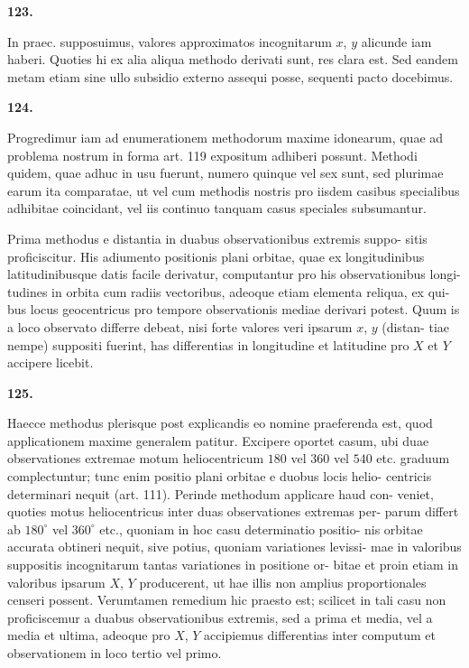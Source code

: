 \documentclass[12pt,a4paper]{article}
\begin{document}
\bigskip
\noindent\textbf{123.}

In praec. supposuimus, valores approximatos incognitarum $x$, $y$ alicunde
iam haberi. Quoties hi ex alia aliqua methodo derivati sunt, res clara est.
Sed eandem metam etiam sine ullo subsidio externo assequi posse, sequenti
pacto docebimus.

\bigskip
\noindent\textbf{124.}

Progredimur iam ad enumerationem methodorum maxime idonearum, quae
ad problema nostrum in forma art. 119 expositum adhiberi possunt. Methodi
quidem, quae adhuc in usu fuerunt, numero quinque vel sex sunt, sed plurimae
earum ita comparatae, ut vel cum methodis nostris pro iisdem casibus specialibus
adhibitae coincidant, vel iis continuo tanquam casus speciales subsumantur.

Prima methodus e distantia in duabus observationibus extremis suppo-
sitis proficiscitur. His adiumento positionis plani orbitae, quae ex longitudinibus
latitudinibusque datis facile derivatur, computantur pro his observationibus longi-
tudines in orbita cum radiis vectoribus, adeoque etiam elementa reliqua, ex qui-
bus locus geocentricus pro tempore observationis mediae derivari potest. Quum
is a loco observato differre debeat, nisi forte valores veri ipsarum $x$, $y$ (distan-
tiae nempe) suppositi fuerint, has differentias in longitudine et latitudine pro $X$
et $Y$ accipere licebit.

\bigskip
\noindent\textbf{125.}

Haecce methodus plerisque post explicandis eo nomine praeferenda est,
quod applicationem maxime generalem patitur. Excipere oportet casum, ubi
duae observationes extremae motum heliocentricum $180$ vel $360$ vel $540$ etc.
graduum complectuntur; tunc enim positio plani orbitae e duobus locis helio-
centricis determinari nequit (art. 111). Perinde methodum applicare haud con-
veniet, quoties motus heliocentricus inter duas observationes extremas per-
parum differt ab $180^\circ$ vel $360^\circ$ etc., quoniam in hoc casu determinatio positio-
nis orbitae accurata obtineri nequit, sive potius, quoniam variationes levissi-
mae in valoribus suppositis incognitarum tantas variationes in positione or-
bitae et proin etiam in valoribus ipsarum $X$, $Y$ producerent, ut hae illis non
amplius proportionales censeri possent. Verumtamen remedium hic praesto
est; scilicet in tali casu non proficiscemur a duabus observationibus extremis,
sed a prima et media, vel a media et ultima, adeoque pro $X$, $Y$ accipiemus
differentias inter computum et observationem in loco tertio vel primo.
\end{document}
